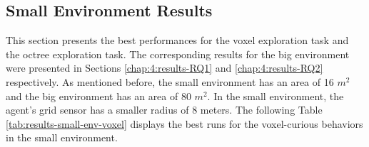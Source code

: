 \newpage
\subsection{Small Environment Results}\label{chap-4:small-env-results}
This section presents the best performances for the voxel exploration task and the octree exploration task. The corresponding results for the big environment were presented in Sections \ref{chap:4:results-RQ1} and \ref{chap:4:results-RQ2} respectively. As mentioned before, the small environment has an area of 16 $m^2$ and the big environment has an area of 80 $m^2$. 
In the small environment, the agent's grid sensor has a smaller radius of 8 meters.
The following Table \ref{tab:results-small-env-voxel} displays the best runs for the voxel-curious behaviors in the small environment.

